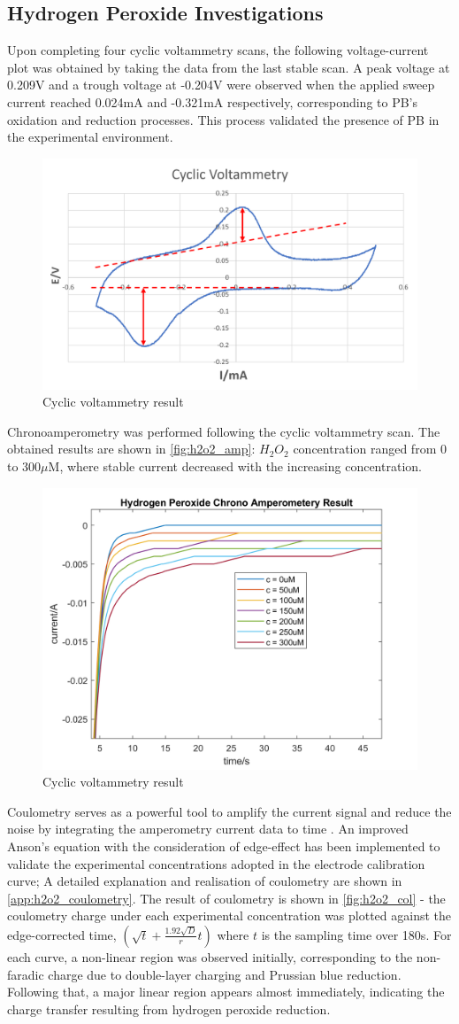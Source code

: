 \subsection{Hydrogen Peroxide Investigations}
Upon completing four cyclic voltammetry scans, the following voltage-current plot was obtained by taking the data from the last stable scan. A peak voltage at 0.209V and a trough voltage at -0.204V were observed when the applied sweep current reached 0.024mA and -0.321mA respectively, corresponding to PB's oxidation and reduction processes. This process validated the presence of PB in the experimental environment.
\begin{figure}[H]
    \centering
    \includegraphics[width=.5\textwidth]{img/h2o2_cv.png}
    \caption{Cyclic voltammetry result}
    \label{fig:h2o2_cv}
\end{figure}
\noindent Chronoamperometry was performed following the cyclic voltammetry scan. The obtained results are shown in \autoref{fig:h2o2_amp}: $H_{2}O_{2}$ concentration ranged from 0 to 300$\mu$M, where stable current decreased with the increasing concentration.
\begin{figure}[H]
    \centering
    \includegraphics[width=.5\textwidth]{img/h2o2_amp.png}
    \caption{Cyclic voltammetry result}
    \label{fig:h2o2_amp}
\end{figure}
\noindent Coulometry serves as a powerful tool to amplify the current signal and reduce the noise by integrating the amperometry current data to time \cite{Anson1966}. An improved Anson's equation with the consideration of edge-effect \cite{Flanagan1973} has been implemented to validate the experimental concentrations adopted in the electrode calibration curve; A detailed explanation and realisation of coulometry are shown in \autoref{app:h2o2_coulometry}. The result of coulometry is shown in \autoref{fig:h2o2_col} - the coulometry charge under each experimental concentration was plotted against the edge-corrected time, $(\sqrt{t}+\frac{1.92\sqrt{D}}{r}t)$ where $t$ is the sampling time over 180s. For each curve, a non-linear region was observed initially, corresponding to the non-faradic charge due to double-layer charging and Prussian blue reduction. Following that, a major linear region appears almost immediately, indicating the charge transfer resulting from  hydrogen peroxide reduction.
